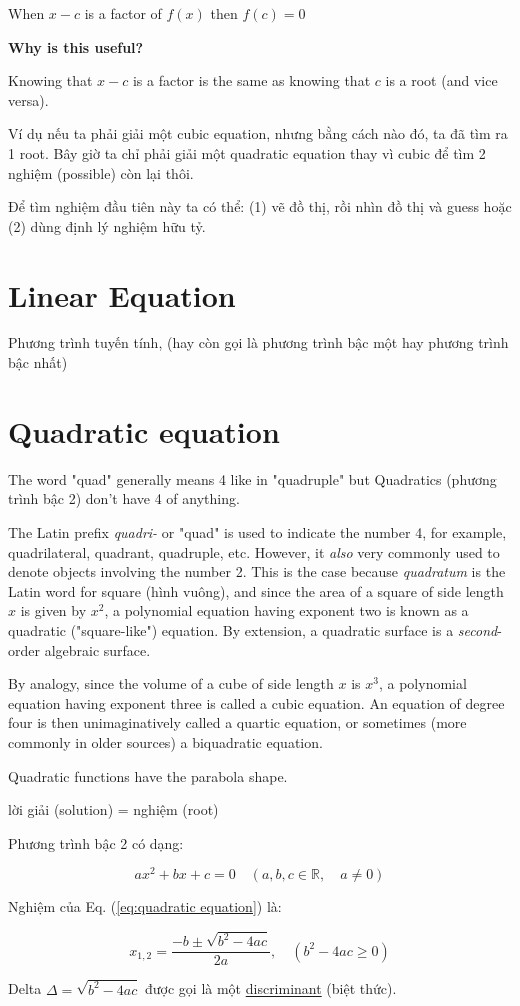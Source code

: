When $x-c$ is a factor of $f(x)$ then $f(c)=0$

\textbf{Why is this useful?}

Knowing that $x-c$ is a factor is the same as knowing that $c$ is a root (and vice versa).

Ví dụ nếu ta phải giải một cubic equation, nhưng bằng cách nào đó, ta đã tìm ra 1 root. Bây giờ ta chỉ phải giải một quadratic equation thay vì cubic để tìm 2 nghiệm (possible) còn lại thôi.

Để tìm nghiệm đầu tiên này ta có thể: (1) vẽ đồ thị, rồi nhìn đồ thị và guess hoặc (2) dùng định lý nghiệm hữu tỷ.

\section{Linear Equation}

Phương trình tuyến tính, (hay còn gọi là phương trình bậc một hay phương trình bậc nhất)

\section{Quadratic equation}

The word "quad" generally means 4 like in "quadruple" but Quadratics (phương trình bậc 2) don't have 4 of anything.

The Latin prefix \textit{quadri-} or "quad" is used to indicate the number 4, for example, quadrilateral, quadrant, quadruple, etc. However, it \textit{also} very commonly used to denote objects involving the number 2. This is the case because \textit{quadratum} is the Latin word for square (hình vuông), and since the area of a square of side length $x$ is given by $x^2$, a polynomial equation having exponent two is known as a quadratic ("square-like") equation. By extension, a quadratic surface is a \textit{second}-order algebraic surface.

By analogy, since the volume of a cube of side length $x$ is $x^3$, a polynomial equation having exponent three is called a cubic equation. An equation of degree four is then unimaginatively called a quartic equation, or sometimes (more commonly in older sources) a biquadratic equation.

Quadratic functions have the parabola shape.


lời giải (solution) = nghiệm (root)

Phương trình bậc 2 có dạng: 

\begin{equation}
  ax^{2}+bx+c=0\quad (a, b, c \in \mathbb{R}, \quad a \ne 0)
  \label{eq:quadratic equation}
\end{equation}

Nghiệm của Eq. (\ref{eq:quadratic equation}) là:

\[x_{1,2}=\frac{-b \pm \sqrt{b^{2}-4ac} }{2a},\quad (b^{2}-4ac \geq0)\]

Delta $\Delta=\sqrt{b^{2}-4ac}$ được gọi là một \href{https://en.wikipedia.org/wiki/Discriminant}{discriminant} (biệt thức).

